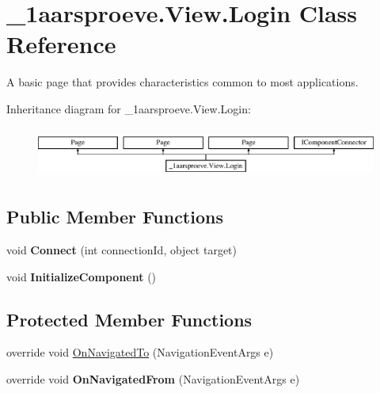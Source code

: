 \hypertarget{class__1aarsproeve_1_1_view_1_1_login}{}\section{\+\_\+1aarsproeve.\+View.\+Login Class Reference}
\label{class__1aarsproeve_1_1_view_1_1_login}


A basic page that provides characteristics common to most applications.  


Inheritance diagram for \+\_\+1aarsproeve.\+View.\+Login\+:\begin{figure}[H]
\begin{center}
\leavevmode
\includegraphics[height=1.686747cm]{class__1aarsproeve_1_1_view_1_1_login}
\end{center}
\end{figure}
\subsection*{Public Member Functions}
\begin{DoxyCompactItemize}
\item 
\hypertarget{class__1aarsproeve_1_1_view_1_1_login_a0b650feb728bff84ba4920865ebeffcd}{}void {\bfseries Connect} (int connection\+Id, object target)\label{class__1aarsproeve_1_1_view_1_1_login_a0b650feb728bff84ba4920865ebeffcd}

\item 
\hypertarget{class__1aarsproeve_1_1_view_1_1_login_a83c979a31b4606a57f03d1f9d095146f}{}void {\bfseries Initialize\+Component} ()\label{class__1aarsproeve_1_1_view_1_1_login_a83c979a31b4606a57f03d1f9d095146f}

\end{DoxyCompactItemize}
\subsection*{Protected Member Functions}
\begin{DoxyCompactItemize}
\item 
override void \hyperlink{class__1aarsproeve_1_1_view_1_1_login_a1d8445503157d81e1f1c70067f83e05a}{On\+Navigated\+To} (Navigation\+Event\+Args e)
\item 
\hypertarget{class__1aarsproeve_1_1_view_1_1_login_a6d48da78661aa250f8737da036c25d15}{}override void {\bfseries On\+Navigated\+From} (Navigation\+Event\+Args e)\label{class__1aarsproeve_1_1_view_1_1_login_a6d48da78661aa250f8737da036c25d15}

\end{DoxyCompactItemize}
